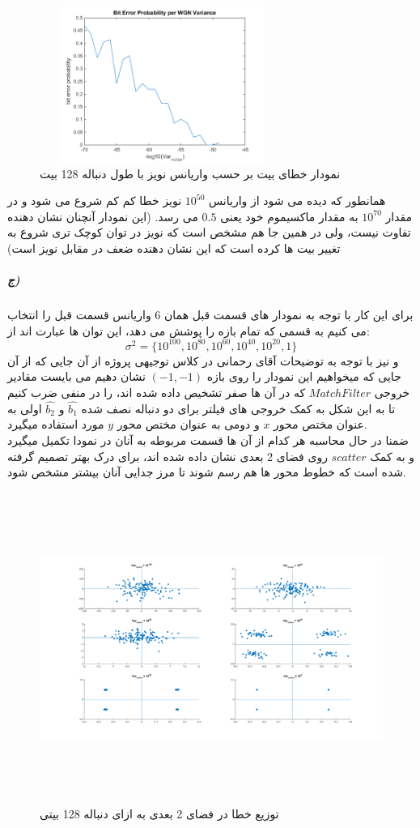 \documentclass[a4paper,12pt]{article}
\begin{document}
\begin{figure}[htbp]
\centerline{\includegraphics[width=3.125in, height=2in]{../3.Transferring0and1/Q2PB_128.png}}
\caption{نمودار خطای بیت بر حسب واریانس نویز با طول دنباله 128 بیت}
\label{fig}
\end{figure}
همانطور که دیده می شود از واریانس $10^{50}$ نویز خطا کم کم شروع می شود و در مقدار $10^{70}$ به مقدار ماکسیموم خود یعنی $0.5$ می رسد. (این نمودار آنچنان نشان دهنده تفاوت نیست، ولی در همین جا هم مشخص است که نویز در توان کوچک تری شروع به تغییر بیت ها کرده است که این نشان دهنده ضعف در مقابل نویز است)
\clearpage
\subparagraph{ج)}
برای این کار با توجه به نمودار های قسمت قبل همان 6 واریانس قسمت قبل را انتخاب می کنیم به قسمی  که تمام بازه را پوشش می دهد، این توان ها عبارت اند از:
$$
\sigma^2 = \{10^{100}, 10^{80}, 10^{60}, 10^{40}, 10^{20}, 1\}
$$
و نیز با توجه به توضیحات آقای رحمانی در کلاس توجیهی پروژه از آن جایی که از آن جایی که میخواهیم این نمودار را روی بازه $(-1,-1)$ نشان دهیم می بایست مقادیر خروجی $MatchFilter$ که در آن ها صفر تشخیص داده شده اند، را در منفی ضرب کنیم تا به این شکل به کمک خروجی های فیلتر برای دو دنباله نصف شده $\hat{b_1}$ و $\hat{b_2}$ اولی به عنوان مختص محور $x$ و دومی به عنوان مختص محور $y$ مورد استفاده میگیرد.
\\
ضمنا در حال محاسبه هر کدام از آن ها قسمت مربوطه به آنان در نمودا تکمیل میگیرد و به کمک $scatter$ روی فضای 2 بعدی نشان داده شده اند، برای درک بهتر تصمیم گرفته شده است که خطوط محور ها هم رسم شوند تا مرز جدایی آنان بیشتر مشخص شود.
\begin{figure}[htbp]
\centerline{\includegraphics[width=6.625in, height=4in]{../3.Transferring0and1/Q2PC.png}}
\caption{توزیع خطا در فضای 2 بعدی به ازای دنباله 128 بیتی}
\label{fig}
\end{figure}
\end{document}
